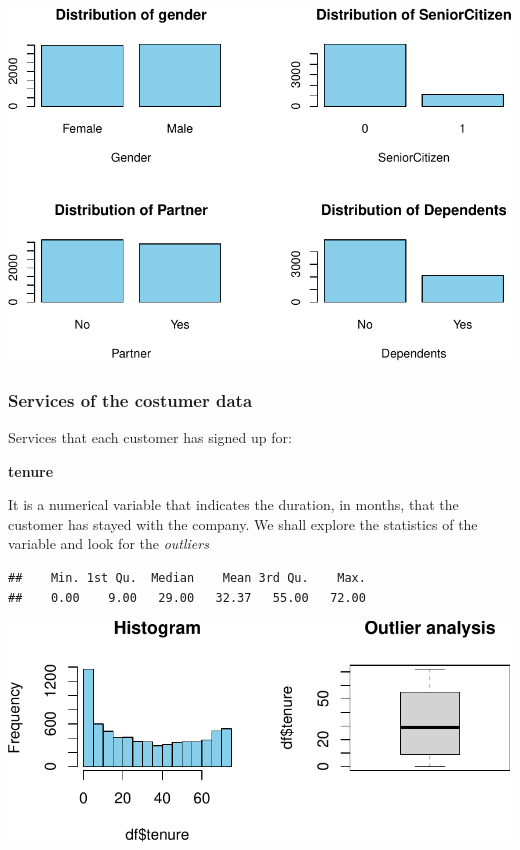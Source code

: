 \documentclass[
  twoside]{article}
\begin{document}
\includegraphics{Assigment2_files/figure-latex/unnamed-chunk-8-1.pdf}

\hypertarget{services-of-the-costumer-data}{%
\subsubsection{\texorpdfstring{\textbf{Services of the costumer
data}}{Services of the costumer data}}\label{services-of-the-costumer-data}}

Services that each customer has signed up for:

\textbf{tenure}

It is a numerical variable that indicates the duration, in months, that
the customer has stayed with the company. We shall explore the
statistics of the variable and look for the \emph{outliers}

\begin{verbatim}
##    Min. 1st Qu.  Median    Mean 3rd Qu.    Max. 
##    0.00    9.00   29.00   32.37   55.00   72.00
\end{verbatim}

\includegraphics{Assigment2_files/figure-latex/unnamed-chunk-9-1.pdf}
\end{document}
